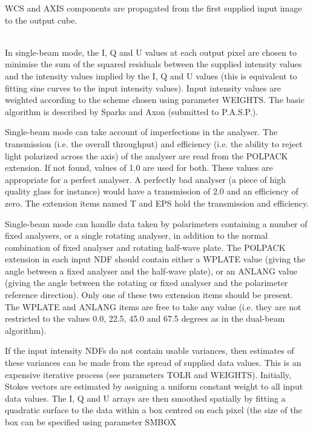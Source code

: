 \documentclass[twoside,11pt]{article}
\renewcommand{\_}{\texttt{\symbol{95}}}
\newcommand{\sstdiytopic}[2]{\item[{\hspace{-0.35em}#1\hspace{-0.35em}:}]
\mbox{} \\[1.3ex] #2}
\newcommand{\sstitemlist}[1]{
  \mbox{} \\
  \vspace{-3.5ex}
  \begin{itemize}
     #1
  \end{itemize}
}
\newcommand{\sstitem}{\item}
\newcommand{\sstdiytopic}[2]{\item[{#1}] #2 }
\newcommand{\sstitemlist}[1]{
      \begin{itemize}
         #1
      \end{itemize}
      \\
   }
\newcommand{\sstitem}{\item}
\begin{document}
{{{         \sstitem
         WCS and AXIS components are propagated from the first supplied
         input image to the output cube.
      }
   }
   \sstdiytopic{
      The Single-beam Algorithm
   }{
      In single-beam mode, the I, Q and U values at each output pixel are
      chosen to minimise the sum of the squared residuals between the
      supplied intensity values and the intensity values implied by the I,
      Q and U values (this is equivalent to fitting sine curves to the
      input intensity values). Input intensity values are weighted
      according to the scheme chosen using parameter WEIGHTS. The basic
      algorithm is described by Sparks and Axon (submitted to P.A.S.P.).

      Single-beam mode can take account of imperfections in the analyser.
      The transmission (i.e. the overall throughput) and efficiency
      (i.e. the ability to reject light polarized across the axis) of the
      analyser are read from the POLPACK extension. If not found, values
      of 1.0 are used for both. These values are appropriate for a
      perfect analyser. A perfectly bad analyser (a piece of high quality
      glass for instance) would have a transmission of 2.0 and an
      efficiency of zero. The extension items named T and EPS hold the
      transmission and efficiency.

      Single-beam mode can handle data taken by polarimeters containing
      a number of fixed analysers, or a single rotating analyser, in
      addition to the normal combination of fixed analyser and rotating
      half-wave plate. The POLPACK extension in each input NDF should
      contain either a WPLATE value (giving the angle between a fixed
      analyser and the half-wave plate), or an ANLANG value (giving the
      angle between the rotating or fixed analyser and the polarimeter
      reference direction). Only one of these two extension items
      should be present. The WPLATE and ANLANG items are free to take
      any value (i.e. they are not restricted to the values 0.0, 22.5,
      45.0 and 67.5 degrees as in the dual-beam algorithm).

      If the input intensity NDFs do not contain usable variances,
      then estimates of these variances can be made from the spread of
      supplied data values. This is an expensive iterative process
      (see parameters TOLR and WEIGHTS). Initially, Stokes vectors
      are estimated by assigning a uniform constant weight to all input
      data values. The I, Q and U arrays are then smoothed spatially by
      fitting a quadratic surface to the data within a box centred on each
      pixel (the size of the box can be specified using parameter SMBOX
      \sstitemlist{

}}}
\end{document}
